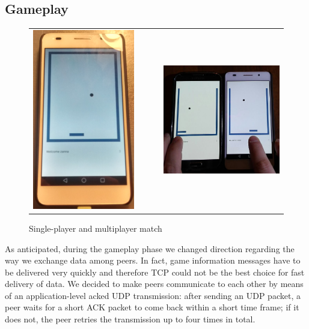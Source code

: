 \subsection{Gameplay}



\begin{figure}[H]
  \centering
  \begin{tabular}{@{}c@{}c@{}c}
      \includegraphics[width=.3\columnwidth]{img/singleplayer}
    \label{fig:singleplayer}
    &
    \mbox{\ \ \ }
    &
      \includegraphics[width=.5\columnwidth]{img/multiplayer}
      \label{fig:multiplayer}
  \end{tabular}
    \caption{Single-player and multiplayer match}
\end{figure}

As anticipated, during the gameplay phase we changed direction regarding the
way we exchange data among peers. In fact, game information messages have to
be delivered very quickly and therefore TCP could not be the best choice for
fast delivery of data. We decided to make peers communicate to each other by
means of an application-level acked UDP transmission: after sending an UDP
packet, a peer waits for a short ACK packet to come back within a short time
frame; if it does not, the peer retries the transmission up to four times in
total.


